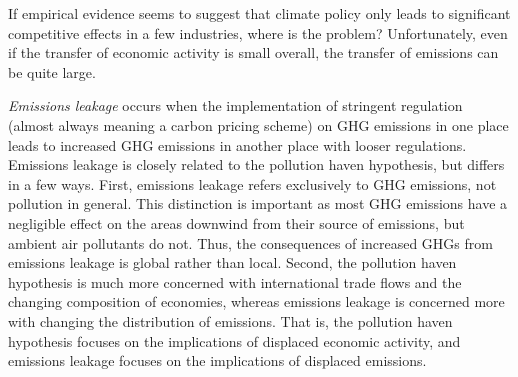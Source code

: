 If empirical evidence seems to suggest that climate policy only leads to significant competitive effects in a few industries, where is the problem? Unfortunately, even if the transfer of economic activity is small overall, the transfer of emissions can be quite large.

\emph{Emissions leakage} occurs when the implementation of stringent regulation (almost always meaning a carbon pricing scheme) on GHG emissions in one place leads to increased GHG emissions in another place with looser regulations. Emissions leakage is closely related to the pollution haven hypothesis, but differs in a few ways. First, emissions leakage refers exclusively to GHG emissions, not pollution in general. This distinction is important as most GHG emissions have a negligible effect on the areas downwind from their source of emissions, but ambient air pollutants do not. Thus, the consequences of increased GHGs from emissions leakage is global rather than local. Second, the pollution haven hypothesis is much more concerned with international trade flows and the changing composition of economies, whereas emissions leakage is concerned more with changing the distribution of emissions. That is, the pollution haven hypothesis focuses on the implications of displaced economic activity, and emissions leakage focuses on the implications of displaced emissions.

